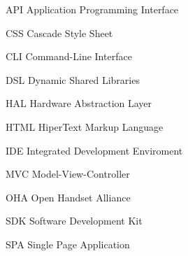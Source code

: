 \begin{siglas}
  
  \item[API] Application Programming Interface
  \item[CSS] Cascade Style Sheet
  \item[CLI] Command-Line Interface
  \item[DSL] Dynamic Shared Libraries
  \item[HAL] Hardware Abstraction Layer
  \item[HTML] HiperText Markup Language
  \item[IDE] Integrated Development Enviroment
  \item[MVC] Model-View-Controller
  \item[OHA] Open Handset Alliance
  \item[SDK] Software Development Kit
  \item[SPA] Single Page Application
    
\end{siglas}
